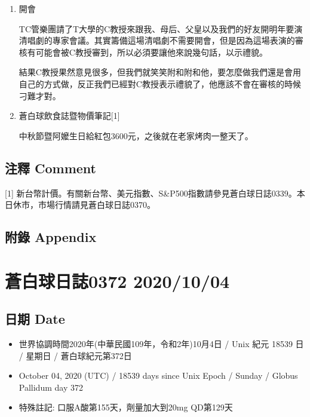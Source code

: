 \documentclass[a5paper, 11pt
]{book}
\providecommand{\tightlist}{%
  \setlength{\itemsep}{0pt}\setlength{\parskip}{0pt}}
\begin{document}
\begin{enumerate}
\def\labelenumi{\arabic{enumi}.}
\item
  開會

  TC管樂團請了T大學的C教授來跟我、母后、父皇以及我們的好友開明年要演清唱劇的專家會議。其實籌備這場清唱劇不需要開會，但是因為這場表演的審核有可能會被C教授審到，所以必須要讓他來說幾句話，以示禮貌。

  結果C教授果然意見很多，但我們就笑笑附和附和他，要怎麼做我們還是會用自己的方式做，反正我們已經對C教授表示禮貌了，他應該不會在審核的時候刁難才對。
\item
  蒼白球飲食誌暨物價筆記{[}1{]}

  中秋節暨阿嬤生日給紅包3600元，之後就在老家烤肉一整天了。
\end{enumerate}

\hypertarget{ux6ce8ux91cb-comment-30}{%
\subsection{注釋 Comment}\label{ux6ce8ux91cb-comment-30}}

{[}1{]}
新台幣計價。有關新台幣、美元指數、S\&P500指數請參見蒼白球日誌0339。本日休市，市場行情請見蒼白球日誌0370。

\hypertarget{ux9644ux9304-appendix-30}{%
\subsection{附錄 Appendix}\label{ux9644ux9304-appendix-30}}

\hypertarget{ux84bcux767dux7403ux65e5ux8a8c0372-20201004}{%
\section{蒼白球日誌0372
2020/10/04}\label{ux84bcux767dux7403ux65e5ux8a8c0372-20201004}}

\hypertarget{ux65e5ux671f-date-31}{%
\subsection{日期 Date}\label{ux65e5ux671f-date-31}}

\begin{itemize}
\tightlist
\item
  世界協調時間2020年(中華民國109年，令和2年)10月4日 / Unix 紀元 18539 日
  / 星期日 / 蒼白球紀元第372日
\item
  October 04, 2020 (UTC) / 18539 days since Unix Epoch / Sunday / Globus
  Pallidum day 372
\item
  特殊註記: 口服A酸第155天，劑量加大到20mg QD第129天
\end{itemize}
\end{document}
